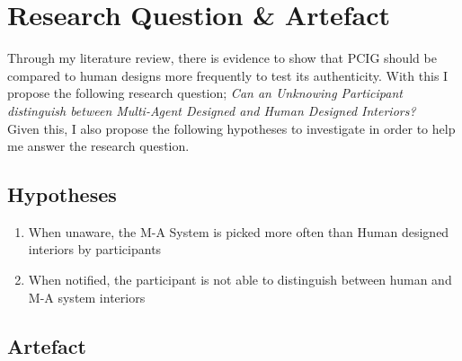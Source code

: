 \section{Research Question \& Artefact}


Through my literature review, there is evidence to show that PCIG should be compared to human designs more frequently to test its authenticity. With this I propose the following research question; \textit{Can an Unknowing Participant distinguish between Multi-Agent Designed and Human Designed Interiors?}
\\
Given this, I also propose the following hypotheses to investigate in order to help me answer the research question.

\subsection{Hypotheses}
\begin{enumerate}
    \item When unaware, the M-A System is picked more often than Human designed interiors by participants
    \item When notified, the participant is not able to distinguish between human and M-A system interiors
\end{enumerate}

\subsection{Artefact}



